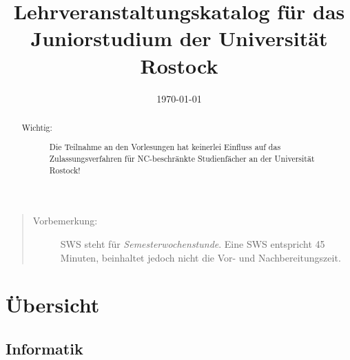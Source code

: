 \documentclass[%
a4paper, %
11pt,               %
leqno,              %
fleqn,              %
]
{scrartcl}
\title{Lehrveranstaltungskatalog für das Juniorstudium der Universität Rostock}
\author{\today}
\date{}
\begin{document}
\maketitle

\begin{abstract}
  \begin{description}
    \item[Wichtig:] Die Teilnahme an den Vorlesungen hat keinerlei Einfluss auf
      das Zulassungsverfahren für NC-beschränkte Studienfächer an der
      Universität Rostock!
  \end{description}
\end{abstract}

\tableofcontents

\begin{quote}
  \begin{description}
    \item[Vorbemerkung:] SWS steht für \textit{Semesterwochenstunde}. Eine SWS
      entspricht 45 Minuten, beinhaltet jedoch nicht die Vor- und
      Nachbereitungszeit.
  \end{description}
\end{quote}

\newpage

\section{Übersicht} %
\label{sec:Übersicht}

\subsection{Informatik} %
\label{sec:Informatik}

\renewcommand{\arraystretch}{1.5}
\end{document}
